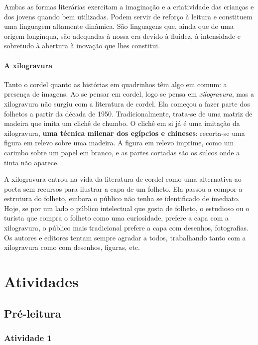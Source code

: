 \documentclass[11pt]{extarticle}
\begin{document}
Ambas as formas literárias exercitam a imaginação e a criatividade das crianças e dos jovens 
quando bem utilizadas. Podem servir de reforço à leitura e constituem uma linguagem altamente dinâmica. 
São linguagens que, ainda que de uma origem longínqua, são adequadas à nossa era devido à fluidez, 
à intensidade e sobretudo à abertura à inovação que lhes constitui.

\paragraph{A xilogravura}

Tanto o cordel quanto as histórias em quadrinhos têm algo em comum:
a presença de imagens. Ao se pensar em cordel, logo se pensa em \textit{xilogravura}, 
mas a xilogravura não surgiu com a literatura de cordel. Ela começou a fazer
parte dos folhetos a partir da década de 1950. Tradicionalmente, trata-se
de uma matriz de madeira que imita um clichê de chumbo. O clichê em si 
já é uma imitação da xilogravura, \textbf{uma técnica milenar dos egípcios
e chineses}: recorta-se uma figura em relevo sobre uma madeira. A figura 
em relevo imprime, como um carimbo sobre um papel em branco, e as partes
cortadas são os sulcos onde a tinta não aparece. 

A xilogravura entrou na vida da literatura de cordel como uma alternativa 
ao poeta sem recursos para ilustrar a capa de um folheto. Ela passou a compor 
a estrutura do folheto, embora o público não tenha se identificado de imediato. Hoje, se por um lado 
o público intelectual que gosta de folheto, o estudioso ou o turista que compra o 
folheto como uma curiosidade, prefere a capa com a xilogravura, o público mais 
tradicional prefere a capa com desenhos, fotografias. 
Os autores e editores tentam sempre agradar a todos, trabalhando tanto com a xilogravura 
como com desenhos, figuras, etc.

\section{Atividades}

\subsection{Pré-leitura}

\subsubsection{Atividade 1}
\end{document}
